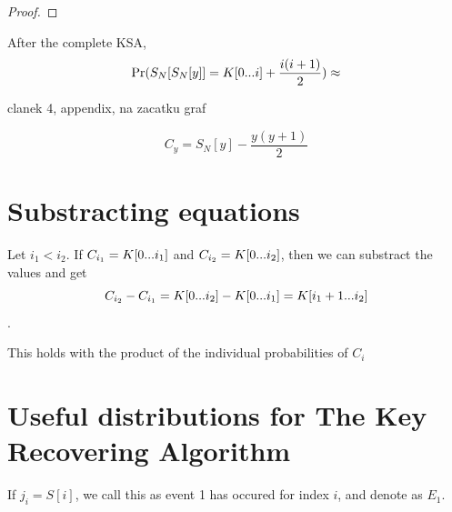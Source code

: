 	\begin{proof}
	\end{proof}
	
	\begin{cor}
\end{cor}
	



\begin{thm}
	After the complete KSA, 
	\[  \Pr(S_{N}[S_{N}[y]] = K[{0}...{i}] + \dfrac{i(i+1)}{2}) \approx  \]
	
	clanek 4, appendix, na zacatku graf
\end{thm}



\begin{notation}
		\[  C_{y} = S_{N}[y] - \dfrac{y(y+1)}{2} \]
\end{notation}






\section{Substracting equations}

Let $i_{1} < i_{2} $. If $ C_{i_{1}} = K[{0}...{i_{1}}] $ and $ C_{i_{2}} = K[{0}...{i_{2}}] $, then we can substract the values and get
\[ C_{i_{2}} - C_{i_{1}} = K[{0}...{i_{2}}] - K[{0}...{i_{1}}] = K[{i_{1} + 1}...{i_{2}}]	\].

This holds with the product of the individual probabilities of $ C_{i} $



\section{Useful distributions for The Key Recovering Algorithm}

\begin{defn}
If $ j_{i} = S[i] $, we call this as event 1 has occured for index $ i $, and denote as $ E_{1} $.
\end{defn}

